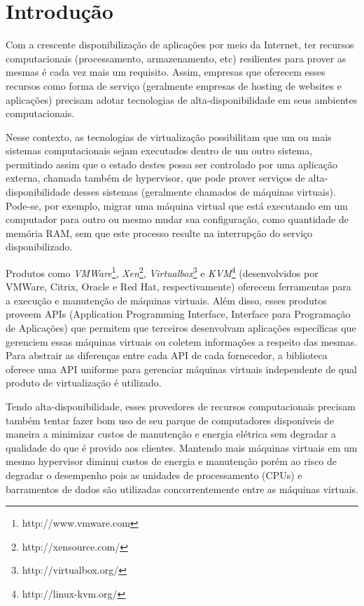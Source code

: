 %
%

\chapter{Introdução}

Com a crescente disponibilização de aplicações por meio da Internet, ter
recursos computacionais (processamento, armazenamento, etc) resilientes
para prover as mesmas é cada vez mais um requisito. Assim, empresas que
oferecem esses recursos como forma de serviço (geralmente empresas de
hosting de websites e aplicações) precisam adotar tecnologias de
alta-disponibilidade em seus ambientes computacionais.

Nesse contexto, as tecnologias de virtualização possibilitam que um ou mais
sistemas computacionais sejam executados dentro de um outro sistema,
permitindo assim que o estado destes possa ser controlado por uma aplicação
externa, chamada também de hypervisor, que pode prover serviços de
alta-disponibilidade desses sistemas (geralmente chamados de máquinas
virtuais). Pode-se, por exemplo, migrar uma máquina virtual que está
executando em um computador para outro ou mesmo mudar sua configuração,
como quantidade de memória RAM, sem que este processo resulte na
interrupção do serviço disponibilizado.

Produtos como \emph{VMWare}\footnote{http://www.vmware.com},
\emph{Xen}\footnote{http://xensource.com/},
\emph{Virtualbox}\footnote{http://virtualbox.org/} e
\emph{KVM}\footnote{http://linux-kvm.org/} (desenvolvidos por VMWare,
Citrix, Oracle e Red Hat, respectivamente) oferecem ferramentas para a
execução e manutenção de máquinas virtuais. Além disso, esses produtos
proveem APIs (Application Programming Interface, Interface para Programação
de Aplicações) que permitem que terceiros desenvolvam aplicações
específicas que gerenciem essas máquinas virtuais ou coletem informações a
respeito das mesmas. Para abstrair as diferenças entre cada API de cada
fornecedor, a biblioteca \libvirt{} oferece uma API uniforme para gerenciar
máquinas virtuais independente de qual produto de virtualização é
utilizado.

Tendo alta-disponibilidade, esses provedores de recursos computacionais
precisam também tentar fazer bom uso de seu parque de computadores
disponíveis de maneira a  minimizar custos de manutenção e energia elétrica
sem degradar a qualidade do que é provido aos clientes. Mantendo mais
máquinas virtuais em um mesmo hypervisor diminui custos de energia e
manutenção porém ao risco de degradar o desempenho pois as unidades de
processamento (CPUs) e barramentos de dados são utilizadas concorrentemente
entre as máquinas virtuais.

